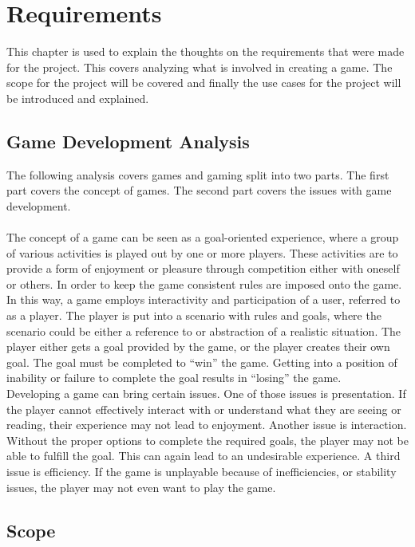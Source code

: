 
\chapter{Requirements}

This chapter is used to explain the thoughts on the requirements that
 were made for the project. This covers analyzing what is involved in creating
  a game. The scope for the project will be covered and finally the use cases
   for the project will be introduced and explained.

\section{Game Development Analysis}

The following analysis covers games and gaming split into two parts.
The first part covers the concept of games. The second part covers the
issues with game development.\\\\
The concept of a game can be seen as a goal-oriented experience,
where a group of various activities is played out by one or more players.
These activities are to provide a form of enjoyment or pleasure through
 competition either with oneself or others. In order to keep the game
  consistent rules are imposed onto the game. \\
In this way, a game employs interactivity and participation of a user,
referred to as a player. The player is put into a scenario with rules and
 goals, where the scenario could be either a reference to or abstraction of
  a realistic situation. The player either gets a goal provided by the game,
   or the player creates their own goal. The goal must be completed to “win”
    the game. Getting into a position of inability or failure to complete the
     goal results in “losing” the game.\\
Developing a game can bring certain issues. One of those issues is
 presentation. If the player cannot effectively interact with or understand
  what they are seeing or reading, their experience may not lead to enjoyment.
   Another issue is interaction. Without the proper options to complete the
    required goals, the player may not be able to fulfill the goal. This can
     again lead to an undesirable experience. A third issue is efficiency. If
      the game is unplayable because of inefficiencies, or stability issues,
       the player may not even want to play the game.

\section{Scope}


